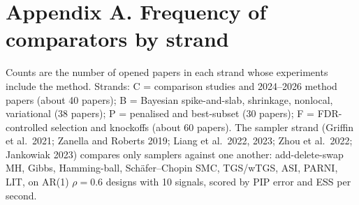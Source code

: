 \documentclass[11pt,letterpaper]{article}
\begin{document}
\section*{Appendix A. Frequency of comparators by strand}

Counts are the number of opened papers in each strand whose experiments include the method. Strands: C = comparison studies and 2024--2026 method papers (about 40 papers); B = Bayesian spike-and-slab, shrinkage, nonlocal, variational (38 papers); P = penalised and best-subset (30 papers); F = FDR-controlled selection and knockoffs (about 60 papers). The sampler strand (Griffin et al.\ 2021; Zanella and Roberts 2019; Liang et al.\ 2022, 2023; Zhou et al.\ 2022; Jankowiak 2023) compares only samplers against one another: add-delete-swap MH, Gibbs, Hamming-ball, Schäfer--Chopin SMC, TGS/wTGS, ASI, PARNI, LIT, on AR(1) $\rho=0.6$ designs with 10 signals, scored by PIP error and ESS per second.
\end{document}
